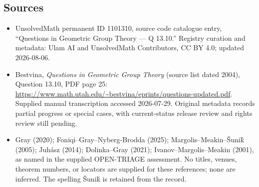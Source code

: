 \documentclass[11pt]{article}
\begin{document}
\subsection{Sources}
\begin{itemize}
\item UnsolvedMath permanent ID 1101310, source code catalogue entry, ``Questions in Geometric Group Theory --- Q 13.10.'' Registry curation and metadata: Ulam AI and UnsolvedMath Contributors, CC BY 4.0; updated 2026-08-06.
\item Bestvina, \emph{Questions in Geometric Group Theory} (source list dated 2004), Question 13.10, PDF page 25: \url{https://www.math.utah.edu/~bestvina/eprints/questions-updated.pdf}. Supplied manual transcription accessed 2026-07-29. Original metadata records partial progress or special cases, with current-status release review and rights review still pending.
\item Gray (2020); Foniqi--Gray--Nyberg-Brodda (2025); Margolis--Meakin--Šuniḱ (2005); Juhász (2014); Dolinka--Gray (2021); Ivanov--Margolis--Meakin (2001), as named in the supplied OPEN-TRIAGE assessment. No titles, venues, theorem numbers, or locators are supplied for these references; none are inferred. The spelling Šuniḱ is retained from the record.
\end{itemize}
\end{document}
